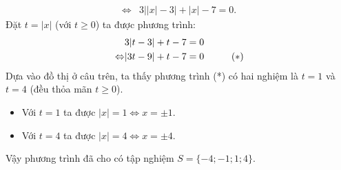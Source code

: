 \begin{ex}
{\begin{enumerate}
\begin{align*}
   \Leftrightarrow & 3 \left| |x| - 3 \right| + |x| - 7 = 0.
  \end{align*}
  Đặt $t = |x|$ (với $t \geq 0$) ta được phương trình:
  \begin{align*}
   				   & 3|t - 3| + t - 7 = 0 \\
   \Leftrightarrow & |3t - 9| + t - 7 = 0 \hspace*{1cm} (*)
  \end{align*}
  Dựa vào đồ thị ở câu trên, ta thấy phương trình (*) có hai nghiệm là $t = 1$ và $t = 4$ (đều thỏa mãn $t \geq 0$).
  \begin{itemize}
   \item Với $t = 1$ ta được $|x| = 1 \Leftrightarrow x = \pm 1$.
   \item Với $t = 4$ ta được $|x| = 4 \Leftrightarrow x = \pm 4$.
  \end{itemize}
  Vậy phương trình đã cho có tập nghiệm $S = \{-4; -1; 1; 4\}$.
 \end{enumerate}
 }
\end{ex}


